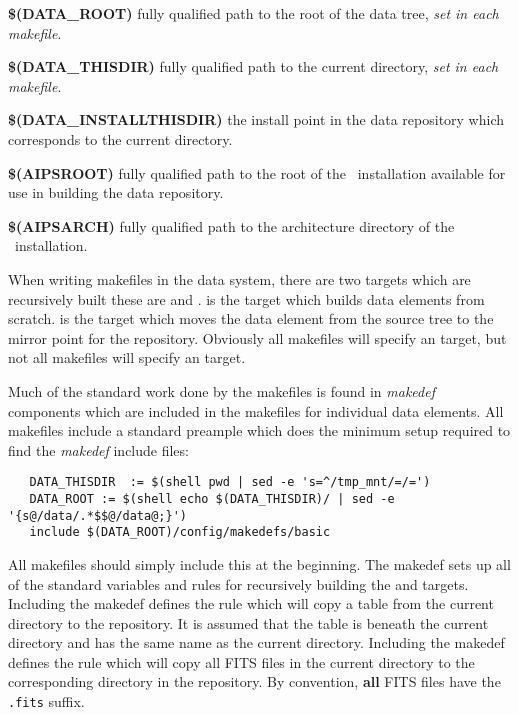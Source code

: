 \begin{list}{}{\setlength{\rightmargin}{\leftmargin}}

\item{\textbf{\$(DATA\_ROOT)}} fully qualified path to the root of the
data tree, \textit{set in each makefile}.

\item{\textbf{\$(DATA\_THISDIR)}} fully qualified path to the current
directory, \textit{set in each makefile}.

\item{\textbf{\$(DATA\_INSTALLTHISDIR)}} the install point in the data
repository which corresponds to the current directory.

\item{\textbf{\$(AIPSROOT)}} fully qualified path to the root of the
\aipspp\ installation available for use in building the data repository.

\item{\textbf{\$(AIPSARCH)}} fully qualified path to the architecture
directory of the \aipspp\ installation.

\end{list}

When writing makefiles in the data system, there are two targets which
are recursively built these are  and . 
is the target which builds data elements from scratch.  is
the target which moves the data element from the source tree to the
mirror point for the repository. Obviously all makefiles will specify
an  target, but not all makefiles will specify an 
target.

Much of the standard work done by the makefiles is found in \textit{makedef}
components which are included in the makefiles for individual data
elements. All makefiles include a standard preample which does the minimum
setup required to find the \textit{makedef} include files:

\begin{verbatim}
   DATA_THISDIR  := $(shell pwd | sed -e 's=^/tmp_mnt/=/=')
   DATA_ROOT := $(shell echo $(DATA_THISDIR)/ | sed -e '{s@/data/.*$$@/data@;}')
   include $(DATA_ROOT)/config/makedefs/basic
\end{verbatim}

\noindent
All makefiles should simply include this at the beginning. The  makedef
sets up all of the standard variables and rules for recursively building the
 and  targets. Including the 
makedef defines the rule which will copy a table from the current directory
to the repository. It is assumed that the table is beneath the current directory
and has the same name as the current directory. Including the 
makedef defines the rule which will copy all FITS files in the current directory
to the corresponding directory in the repository. By convention, \textbf{all}
FITS files have the \verb+.fits+ suffix.

